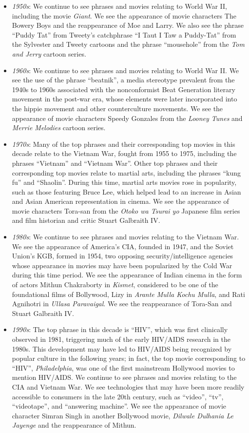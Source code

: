 \documentclass{article}
\begin{document}
\begin{multicols}{2}
\begin{itemize}
    \item \textit{1950s}: We continue to see phrases and movies relating to World War II, including the movie \textit{Giant}. We see the appearance of movie characters The Bowery Boys and the reappearance of Moe and Larry. We also see the phrase ``Puddy Tat'' from Tweety's catchphrase ``I Taut I Taw a Puddy-Tat'' from the Sylvester and Tweety cartoons and the phrase ``mousehole'' from the \textit{Tom and Jerry} cartoon series.
    \item \textit{1960s}: We continue to see phrases and movies relating to World War II. We see the use of the phrase ``beatnik'', a media stereotype prevalent from the 1940s to 1960s associated with the nonconformist Beat Generation literary movement in the post-war era, whose elements were later incorporated into the hippie movement and other counterculture movements. We see the appearance of movie characters Speedy Gonzales from the \textit{Looney Tunes} and \textit{Merrie Melodies} cartoon series.
    \item \textit{1970s}: Many of the top phrases and their corresponding top movies in this decade relate to the Vietnam War, fought from 1955 to 1975, including the phrases ``Vietnam'' and ``Vietnam War''. Other top phrases and their corresponding top movies relate to martial arts, including the phrases ``kung fu'' and ``Shaolin''. During this time, martial arts movies rose in popularity, such as those featuring Bruce Lee, which helped lead to an increase in Asian and Asian American representation in cinema. We see the appearance of movie characters Tora-san from the \textit{Otoko wa Tsurai yo} Japanese film series and film historian and critic Stuart Galbraith IV.
    \item \textit{1980s}: We continue to see phrases and movies relating to the Vietnam War. We see the appearance of America's CIA, founded in 1947, and the Soviet Union's KGB, formed in 1954, two opposing security/intelligence agencies whose appearance in movies may have been popularized by the Cold War during this time period. We see the appearance of Indian cinema in the form of actors Mithun Chakraborty in \textit{Kismet}, considered to be one of the foundational films of Bollywood, Lizy in \textit{Arante Mulla Kochu Mulla}, and Rati Agnihotri in \textit{Ullasa Paravaigal}. We see the reappearance of Tora-San and Stuart Galbraith IV.
    \item \textit{1990s}: The top phrase in this decade is ``HIV'', which was first clinically observed in 1981, triggering much of the early HIV/AIDS research in the 1980s. This development may have led to HIV/AIDS being recognized by popular culture in the following years; in fact, the top movie corresponding to ``HIV'', \textit{Philadelphia}, was one of the first mainstream Hollywood movies to mention HIV/AIDS. We continue to see phrases and movies relating to the CIA and Vietnam War. We see technologies that may have been more readily accessible to consumers in the late 20th century, such as ``video'', ``tv'', ``videotape'', and ``answering machine''. We see the appearance of movie character Simran Singh in another Bollywood movie, \textit{Dilwale Dulhania Le Jayenge} and the reappearance of Mithun.

\end{itemize}
\end{multicols}
\end{document}
